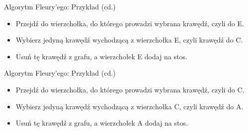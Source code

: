 \documentclass[polish,envcountsect,10pt]{beamer}
\begin{document}
\begin{frame}{Algorytm Fleury'ego: Przykład (cd.)}
    \begin{itemize}
        \item Przejdź do wierzchołka, do którego prowadzi wybrana krawędź, czyli do E.
        \item Wybierz jedyną krawędź wychodzącą z wierzchołka E, czyli krawędź do C.
        \item Usuń tę krawędź z grafu, a wierzchołek E dodaj na stos.
    \end{itemize}
    \begin{center}
    \end{center}
\end{frame}

\begin{frame}{Algorytm Fleury'ego: Przykład (cd.)}
    \begin{itemize}
        \item Przejdź do wierzchołka, do którego prowadzi wybrana krawędź, czyli do C.
        \item Wybierz jedyną krawędź wychodzącą z wierzchołka C, czyli krawędź do A.
        \item Usuń tę krawędź z grafu, a wierzchołek A dodaj na stos.
    \end{itemize}
    \begin{center}
    \end{center}
\end{frame}
\end{document}
